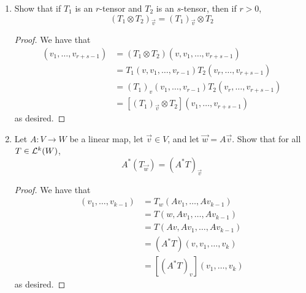 \documentclass[../psets.tex]{subfiles}
\begin{document}
\begin{enumerate}[label={\textbf{1.3.\roman*.}}]
\begin{proof}
\begin{align*}
            &= \lambda T_v(v_1,\dots,v_{k-1})
        \end{align*}
        as desired.
    \end{proof}
    \item Show that if $T_1$ is an $r$-tensor and $T_2$ is an $s$-tensor, then if $r>0$,
    \begin{equation*}
        (T_1\otimes T_2)_\vec{v} = (T_1)_\vec{v}\otimes T_2
    \end{equation*}
    \begin{proof}
        We have that
        \begin{align*}
            [(T_1\otimes T_2)_v](v_1,\dots,v_{r+s-1}) &= (T_1\otimes T_2)(v,v_1,\dots,v_{r+s-1})\\
            &= T_1(v,v_1,\dots,v_{r-1})T_2(v_r,\dots,v_{r+s-1})\\
            &= (T_1)_v(v_1,\dots,v_{r-1})T_2(v_r,\dots,v_{r+s-1})\\
            &= [(T_1)_\vec{v}\otimes T_2](v_1,\dots,v_{r+s-1})
        \end{align*}
        as desired.
    \end{proof}
    \item Let $A:V\to W$ be a linear map, let $\vec{v}\in V$, and let $\vec{w}=A\vec{v}$. Show that for all $T\in\lin[k]{W}$,
    \begin{equation*}
        A^*(T_\vec{w}) = (A^*T)_\vec{v}
    \end{equation*}
    \begin{proof}
        We have that
        \begin{align*}
            [A^*(T_w)](v_1,\dots,v_{k-1}) &= T_w(Av_1,\dots,Av_{k-1})\\
            &= T(w,Av_1,\dots,Av_{k-1})\\
            &= T(Av,Av_1,\dots,Av_{k-1})\\
            &= (A^*T)(v,v_1,\dots,v_k)\\
            &= [(A^*T)_v](v_1,\dots,v_k)
        \end{align*}
        as desired.
    \end{proof}
\end{enumerate}
\end{document}
